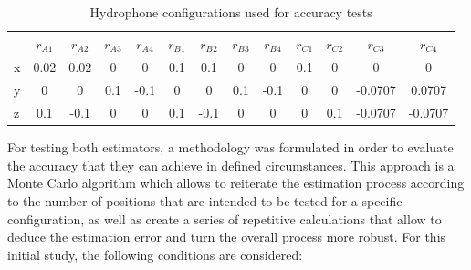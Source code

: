 \begin{table}[!htbp] %
	\begin{center}
		\begin{tabular}{ l | c c c c | c c c c | c c c c}
			\toprule
			\multicolumn{1}{c|}{} & $r_{A1}$ & $r_{A2}$ & $r_{A3}$ & $r_{A4}$ & $r_{B1}$ & $r_{B2}$ & $r_{B3}$ & $r_{B4}$ & $r_{C1}$ & $r_{C2}$ & $r_{C3}$ & $r_{C4}$ \\
			\midrule
			\multirow{1}{0.5em}{x} 
			& 0.02 & 0.02 & 0 & 0 & 0.1 & 0.1 & 0 & 0 & 0.1 & 0 & 0 & 0  \\
			\multirow{1}{0.5em}{y} 
			& 0 & 0 & 0.1 & -0.1 & 0 & 0 & 0.1 & -0.1 & 0 & 0 & -0.0707 & 0.0707 \\
			\multirow{1}{0.5em}{z} 
			& 0.1 & -0.1  & 0 & 0 & 0.1 & -0.1  & 0 & 0 & 0 & 0.1 & -0.0707  & -0.0707\\
			\bottomrule 
		\end{tabular}
		\caption{Hydrophone configurations used for accuracy tests}
		\label{tab:configs_test1}
	\end{center}
\end{table}


For testing both estimators, a methodology was formulated in order to evaluate the accuracy that they can achieve in defined circumstances. This approach is a Monte Carlo algorithm which allows to reiterate the estimation process according to the number of positions that are intended to be tested for a specific configuration, as well as create a series of repetitive calculations that allow to deduce the estimation error and turn the overall process more robust. For this initial study, the following conditions are considered: 

